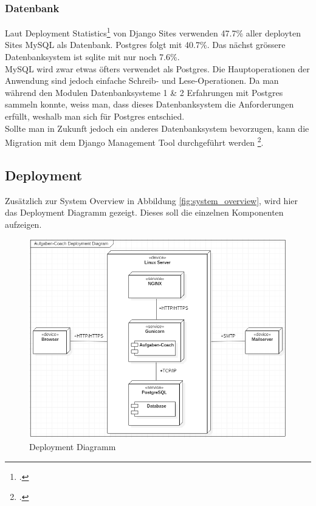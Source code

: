 \subsubsection*{Datenbank}
Laut Deployment Statistics\footcite{deploymentstatistics} von Django Sites verwenden 47.7\% aller deployten Sites MySQL als Datenbank. Postgres folgt mit 40.7\%. Das nächst grössere Datenbanksystem ist sqlite mit nur noch 7.6\%.\\

MySQL wird zwar etwas öfters verwendet als Postgres. Die Hauptoperationen der Anwendung sind jedoch einfache Schreib- und Lese-Operationen. Da man während den Modulen Datenbanksysteme 1 \& 2 Erfahrungen mit Postgres sammeln konnte, weiss man, dass dieses Datenbanksystem die Anforderungen erfüllt, weshalb man sich für Postgres entschied.\\

Sollte man in Zukunft jedoch ein anderes Datenbanksystem bevorzugen, kann die Migration mit dem Django Management Tool durchgeführt werden \footcite{dbmigration}. 

\subsection{Deployment}
Zusätzlich zur System Overview in Abbildung \ref{fig:system_overview}, wird hier das Deployment Diagramm gezeigt. Dieses soll die einzelnen Komponenten aufzeigen.

\begin{figure}[H]
\begin{center}
	\includegraphics[width=\textwidth, keepaspectratio]{images/deployment_diagram.png}
	\caption{Deployment Diagramm}
	\label{fig:deployment_diagram}
\end{center}
\end{figure}

